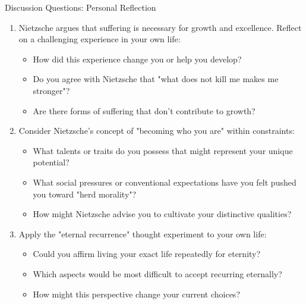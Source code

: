\documentclass{beamer}
\begin{document}
    \begin{frame}{Discussion Questions: Personal Reflection}
        \begin{enumerate}
        \item Nietzsche argues that suffering is necessary for growth and excellence. Reflect on a challenging experience in your own life:
            \begin{itemize}
        \scriptsize

            \item How did this experience change you or help you develop?
            \item Do you agree with Nietzsche that "what does not kill me makes me stronger"?
            \item Are there forms of suffering that don't contribute to growth?
            \end{itemize}
        
        \item Consider Nietzsche's concept of "becoming who you are" within constraints:
            \begin{itemize}
                \scriptsize
            \item What talents or traits do you possess that might represent your unique potential?
            \item What social pressures or conventional expectations have you felt pushed you toward "herd morality"?
            \item How might Nietzsche advise you to cultivate your distinctive qualities?
            \end{itemize}
        
        \item Apply the "eternal recurrence" thought experiment to your own life:
            \begin{itemize}
                \scriptsize
            \item Could you affirm living your exact life repeatedly for eternity?
            \item Which aspects would be most difficult to accept recurring eternally?
            \item How might this perspective change your current choices?
            \end{itemize}
        \end{enumerate}
        \end{frame}
        
\end{document}
